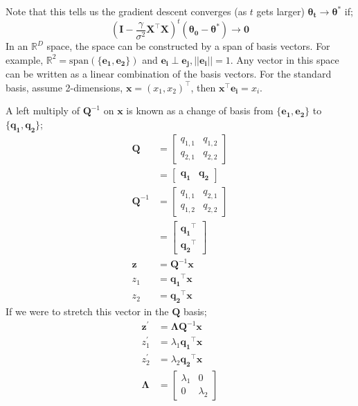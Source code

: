 \documentclass[a4paper, 12pt]{article}
\newcommand{\mat}[1]{\boldsymbol{#1}}
\renewcommand{\vec}[1]{\boldsymbol{#1}}
\newcommand{\mbbr}[0]{\mathbb{R}}
\begin{document}
            Note that this tells us the gradient descent converges (as $t$ gets larger) $\mat{\theta_t} \to \mat{\theta^*}$ if;
            $$(\mat{I} - \frac{\gamma}{\sigma^2}\mat{X}^\top\mat{X})^t(\mat{\theta_0} - \mat{\theta^*}) \to \mat{0}$$
            In an $\mbbr^D$ space, the space can be constructed by a span of basis vectors.
            For example, $\mbbr^2 = \mathrm{span}(\{\vec{e_1}, \vec{e_2}\})$ and $\vec{e_i} \perp \vec{e_j}, || \vec{e_i} || = 1$.
            Any vector in this space can be written as a linear combination of the basis vectors.
            For the standard basis, assume 2-dimensions, $\vec{x} = (x_1, x_2)^\top$, then $\vec{x}^\top\vec{e_i} = x_i$.
            \medskip

            A left multiply of $\mat{Q}^{-1}$ on $\vec{x}$ is known as a change of basis from $\{\vec{e_1}, \vec{e_2}\}$ to $\{\vec{q_1}, \vec{q_2}\}$;
            \begin{align*}
                \mat{Q} & = \begin{bmatrix}
                    q_{1,1} & q_{1,2} \\
                    q_{2,1} & q_{2,2}
                \end{bmatrix} \\
                & = \begin{bmatrix}
                    \vec{q_1} & \vec{q_2}
                \end{bmatrix} \\
                \mat{Q}^{-1} & = \begin{bmatrix}
                    q_{1,1} & q_{2,1} \\
                    q_{1,2} & q_{2,2}
                \end{bmatrix} \\
                & = \begin{bmatrix}
                    \vec{q_1}^\top \\ \vec{q_2}^\top
                \end{bmatrix} \\
                \vec{z} & = \mat{Q}^{-1}\vec{x} \\
                z_1 & = \vec{q_1}^\top\vec{x} \\
                z_2 & = \vec{q_2}^\top\vec{x}
            \end{align*}
            If we were to stretch this vector in the $\mat{Q}$ basis;
            \begin{align*}
                \vec{z^\prime} & = \mat{\Lambda}\mat{Q}^{-1}\vec{x} \\
                z_1^\prime & = \lambda_1\vec{q_1}^\top\vec{x} \\
                z_2^\prime & = \lambda_2\vec{q_2}^\top\vec{x} \\
                \mat{\Lambda} & = \begin{bmatrix}
                    \lambda_1 & 0 \\
                    0 & \lambda_2
                \end{bmatrix}
            \end{align*}
\end{document}
